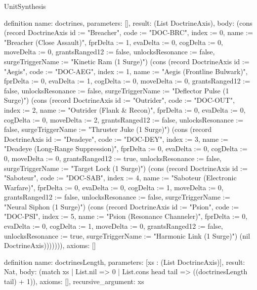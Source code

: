 \begin{lexlean}{UnitSynthesis}
\begin{semanticmodule}
definition{
  name: doctrines,
  parameters: [],
  result: (List DoctrineAxis),
  body: (cons (record DoctrineAxis {id := "Breacher", code := "DOC-BRC", index := 0, name := "Breacher (Close Assault)", fprDelta := 1, evaDelta := 0, cogDelta := 0, moveDelta := 0, grantsRanged12 := false, unlocksResonance := false, surgeTriggerName := "Kinetic Ram (1 Surge)"}) (cons (record DoctrineAxis {id := "Aegis", code := "DOC-AEG", index := 1, name := "Aegis (Frontline Bulwark)", fprDelta := 0, evaDelta := 1, cogDelta := 0, moveDelta := 0, grantsRanged12 := false, unlocksResonance := false, surgeTriggerName := "Deflector Pulse (1 Surge)"}) (cons (record DoctrineAxis {id := "Outrider", code := "DOC-OUT", index := 2, name := "Outrider (Flank & Recon)", fprDelta := 0, evaDelta := 0, cogDelta := 0, moveDelta := 2, grantsRanged12 := false, unlocksResonance := false, surgeTriggerName := "Thruster Juke (1 Surge)"}) (cons (record DoctrineAxis {id := "Deadeye", code := "DOC-DEY", index := 3, name := "Deadeye (Long-Range Suppression)", fprDelta := 0, evaDelta := 0, cogDelta := 0, moveDelta := 0, grantsRanged12 := true, unlocksResonance := false, surgeTriggerName := "Target Lock (1 Surge)"}) (cons (record DoctrineAxis {id := "Saboteur", code := "DOC-SAB", index := 4, name := "Saboteur (Electronic Warfare)", fprDelta := 0, evaDelta := 0, cogDelta := 1, moveDelta := 0, grantsRanged12 := false, unlocksResonance := false, surgeTriggerName := "Neural Siphon (1 Surge)"}) (cons (record DoctrineAxis {id := "Psion", code := "DOC-PSI", index := 5, name := "Psion (Resonance Channeler)", fprDelta := 0, evaDelta := 0, cogDelta := 1, moveDelta := 0, grantsRanged12 := false, unlocksResonance := true, surgeTriggerName := "Harmonic Link (1 Surge)"}) (nil DoctrineAxis))))))),
  axioms: []
}

definition{
  name: doctrinesLength,
  parameters: [xs : (List DoctrineAxis)],
  result: Nat,
  body: (match xs
    | List.nil => 0
    | List.cons head tail => ((doctrinesLength tail) + 1)),
  axioms: [],
  recursive_argument: xs
}


\end{semanticmodule}
\end{lexlean}
